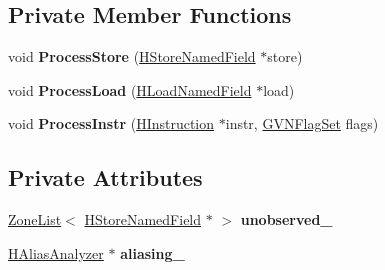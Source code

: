 \subsection*{Private Member Functions}
\begin{DoxyCompactItemize}
\item 
void {\bfseries Process\+Store} (\hyperlink{classv8_1_1internal_1_1_h_store_named_field}{H\+Store\+Named\+Field} $\ast$store)\hypertarget{classv8_1_1internal_1_1_h_store_elimination_phase_a0b20d120fbfeb1bb31ac70348f2d5eb3}{}\label{classv8_1_1internal_1_1_h_store_elimination_phase_a0b20d120fbfeb1bb31ac70348f2d5eb3}

\item 
void {\bfseries Process\+Load} (\hyperlink{classv8_1_1internal_1_1_h_load_named_field}{H\+Load\+Named\+Field} $\ast$load)\hypertarget{classv8_1_1internal_1_1_h_store_elimination_phase_af758bfc8be7dc198bb2f95c4b6e1f0e6}{}\label{classv8_1_1internal_1_1_h_store_elimination_phase_af758bfc8be7dc198bb2f95c4b6e1f0e6}

\item 
void {\bfseries Process\+Instr} (\hyperlink{classv8_1_1internal_1_1_h_instruction}{H\+Instruction} $\ast$instr, \hyperlink{classv8_1_1internal_1_1_enum_set}{G\+V\+N\+Flag\+Set} flags)\hypertarget{classv8_1_1internal_1_1_h_store_elimination_phase_a4c4adede01a29bfe16a915594ec420a2}{}\label{classv8_1_1internal_1_1_h_store_elimination_phase_a4c4adede01a29bfe16a915594ec420a2}

\end{DoxyCompactItemize}
\subsection*{Private Attributes}
\begin{DoxyCompactItemize}
\item 
\hyperlink{classv8_1_1internal_1_1_zone_list}{Zone\+List}$<$ \hyperlink{classv8_1_1internal_1_1_h_store_named_field}{H\+Store\+Named\+Field} $\ast$ $>$ {\bfseries unobserved\+\_\+}\hypertarget{classv8_1_1internal_1_1_h_store_elimination_phase_a8a9eb5f6f89ce8a3d7df4989501390d6}{}\label{classv8_1_1internal_1_1_h_store_elimination_phase_a8a9eb5f6f89ce8a3d7df4989501390d6}

\item 
\hyperlink{classv8_1_1internal_1_1_h_alias_analyzer}{H\+Alias\+Analyzer} $\ast$ {\bfseries aliasing\+\_\+}\hypertarget{classv8_1_1internal_1_1_h_store_elimination_phase_a8177e9d13bfca5eb241b5146c6dca6d3}{}\label{classv8_1_1internal_1_1_h_store_elimination_phase_a8177e9d13bfca5eb241b5146c6dca6d3}

\end{DoxyCompactItemize}
